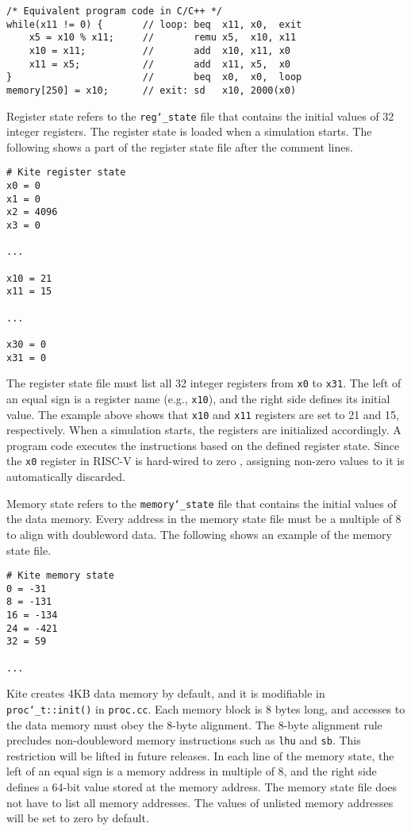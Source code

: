 \documentclass[10pt]{article}
\begin{document}
\begin{Verbatim}[frame=single]
/* Equivalent program code in C/C++ */
while(x11 != 0) {       // loop: beq  x11, x0,  exit
    x5 = x10 % x11;     //       remu x5,  x10, x11
    x10 = x11;          //       add  x10, x11, x0
    x11 = x5;           //       add  x11, x5,  x0
}                       //       beq  x0,  x0,  loop
memory[250] = x10;      // exit: sd   x10, 2000(x0)
\end{Verbatim}

Register state refers to the {\tt reg\char`_state} file that contains the initial values of 32 integer registers.
The register state is loaded when a simulation starts.
The following shows a part of the register state file after the comment lines.

\begin{Verbatim}[frame=single]
# Kite register state
x0 = 0
x1 = 0
x2 = 4096
x3 = 0

...

x10 = 21
x11 = 15

...

x30 = 0
x31 = 0
\end{Verbatim}

The register state file must list all 32 integer registers from {\tt x0} to {\tt x31}.
The left of an equal sign is a register name (e.g., {\tt x10}), and the right side defines its initial value.
The example above shows that {\tt x10} and {\tt x11} registers are set to 21 and 15, respectively.
When a simulation starts, the registers are initialized accordingly.
A program code executes the instructions based on the defined register state.
Since the {\tt x0} register in RISC-V is hard-wired to zero \cite{patterson_morgan2017}, assigning non-zero values to it is automatically discarded.

Memory state refers to the {\tt memory\char`_state} file that contains the initial values of the data memory.
Every address in the memory state file must be a multiple of 8 to align with doubleword data.
The following shows an example of the memory state file.

\begin{Verbatim}[frame=single]
# Kite memory state
0 = -31
8 = -131
16 = -134
24 = -421
32 = 59

...

\end{Verbatim}

Kite creates 4KB data memory by default, and it is modifiable in {\tt proc\char`_t::init()} in {\tt proc.cc}.
Each memory block is 8 bytes long, and accesses to the data memory must obey the 8-byte alignment.
The 8-byte alignment rule precludes non-doubleword memory instructions such as {\tt lhu} and {\tt sb}.
This restriction will be lifted in future releases.
In each line of the memory state, the left of an equal sign is a memory address in multiple of 8, and the right side defines a 64-bit value stored at the memory address.
The memory state file does not have to list all memory addresses.
The values of unlisted memory addresses will be set to zero by default.
\end{document}
